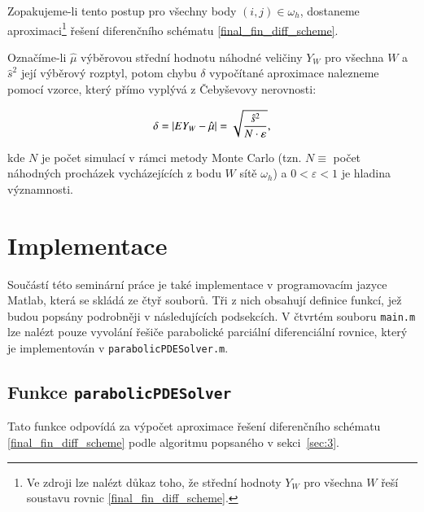 \documentclass[11pt,american,czech]{article}
\begin{document}
Zopakujeme-li tento postup pro všechny body $(i,j)\in\omega_{h}$, dostaneme aproximaci\footnote{Ve zdroji \cite{VIRIUS2010} lze nalézt důkaz toho, že střední hodnoty $Y_{W}$ pro všechna $W$ řeší soustavu rovnic \eqref{final_fin_diff_scheme}.} řešení diferenčního schématu \eqref{final_fin_diff_scheme}.

\medskip

Označíme-li $\hat{\mu}$ výběrovou střední hodnotu náhodné veličiny $Y_{W}$ pro všechna $W$ a $\hat{s}^{2}$ její výběrový rozptyl, potom chybu $\delta$ vypočítané aproximace nalezneme pomocí vzorce, který přímo vyplývá z Čebyševovy nerovnosti:

\begin{equation}\label{eq:error}
	\delta=\arrowvert EY_{W}-\hat{\mu}\arrowvert=\sqrt{\frac{\hat{s}^{2}}{N\cdot\varepsilon}},
\end{equation}

\noindent
kde $N$ je počet simulací v rámci metody Monte Carlo (tzn. $N\equiv$ počet náhodných procházek vycházejících z bodu $W$ sítě $\omega_{h}$) a $0<\varepsilon<1$ je hladina významnosti.

\section{Implementace}\label{sec:4}

Součástí této seminární práce je také implementace v programovacím jazyce Matlab, která se skládá ze čtyř souborů. Tři z nich obsahují definice funkcí, jež budou popsány podrobněji v následujících podsekcích. V čtvrtém souboru \texttt{main.m} lze nalézt pouze vyvolání řešiče parabolické parciální diferenciální rovnice, který je implementován v \texttt{parabolicPDESolver.m}.

\subsection{Funkce \texttt{parabolicPDESolver}}\label{sec:4.1}

Tato funkce odpovídá za výpočet aproximace řešení diferenčního schématu \eqref{final_fin_diff_scheme} podle algoritmu popsaného v sekci~\ref{sec:3}.
\end{document}
